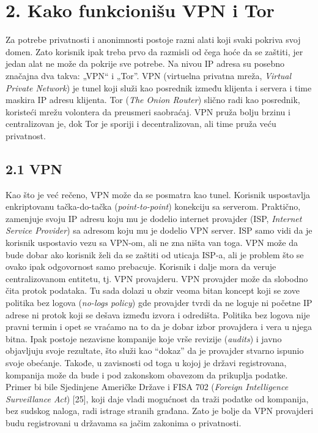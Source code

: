 \documentclass[
]{article}
\begin{document}
\section{2. Kako funkcionišu VPN i Tor}
\label{sec:t2}

Za potrebe privatnosti i anonimnosti postoje razni alati koji svaki
pokriva svoj domen. Zato korisnik ipak treba prvo da razmisli od čega
hoće da se zaštiti, jer jedan alat ne može da pokrije sve potrebe. Na
nivou IP adresa su posebno značajna dva takva: „VPN`` i „Tor''. VPN
(virtuelna privatna mreža, \emph{Virtual Private Network}) je tunel koji služi kao posrednik
između klijenta i servera i time maskira IP adresu klijenta. Tor
(\emph{The Onion Router}) slično radi kao posrednik, koristeći mrežu
volontera da preusmeri saobraćaj. VPN pruža bolju brzinu i centralizovan
je, dok Tor je sporiji i decentralizovan, ali time pruža veću
privatnost.

\subsection{2.1 VPN}
\label{sec:t2.1}

Kao što je već rečeno, VPN može da se posmatra kao tunel. Korisnik
uspostavlja enkriptovanu tačka-do-tačka (\emph{point-to-point}) konekciju sa serverom.
Praktično, zamenjuje svoju IP adresu koju mu je dodelio internet provajder
(ISP, \emph{Internet Service Provider}) sa adresom koju mu je dodelio VPN server.
ISP samo vidi da je korisnik uspostavio vezu sa VPN-om, ali ne
zna ništa van toga. VPN može da bude dobar ako korisnik želi da se
zaštiti od uticaja ISP-a, ali je problem što se ovako ipak odgovornost
samo prebacuje. Korisnik i dalje mora da veruje centralizovanom
entitetu, tj. VPN provajderu. VPN provajder može da slobodno čita protok
podataka. Tu sada dolazi u obzir veoma bitan koncept koji se zove
politika bez logova (\emph{no-logs policy}) gde provajder tvrdi da ne loguje ni početne IP
adrese ni protok koji se dešava između izvora i odredišta. Politika bez logova nije
pravni termin i opet se vraćamo na to da je dobar izbor provajdera i
vera u njega bitna. Ipak postoje nezavisne kompanije koje vrše revizije
(\emph{audits}) i javno objavljuju svoje rezultate, što služi kao ``dokaz'' da
je provajder stvarno ispunio svoje obećanje. Takođe, u zavisnosti od
toga u kojoj je državi registrovana, kompanija može da bude i pod
zakonskom obavezom da prikuplja podatke. Primer bi bile Sjedinjene
Američke Države i FISA 702 (\emph{Foreign Intelligence Surveillance Act}) [25], koji daje vladi mogućnost da traži podatke od
kompanija, bez sudskog naloga, radi istrage stranih građana. Zato je
bolje da VPN provajderi budu registrovani u državama sa jačim zakonima o
privatnosti.
\end{document}
